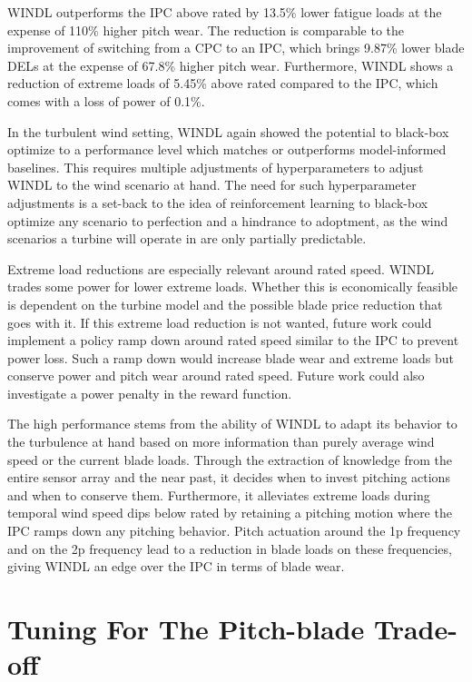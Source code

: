 WINDL outperforms the IPC above rated by 13.5\% lower fatigue loads at the expense of 110\% higher pitch wear. The reduction is comparable to the improvement of switching from a CPC to an IPC, which brings 9.87\% lower blade DELs at the expense of 67.8\% higher pitch wear. Furthermore, WINDL shows a reduction of extreme loads of 5.45\% above rated compared to the IPC, which comes with a loss of power of 0.1\%.

In the turbulent wind setting, WINDL again showed the potential to black-box optimize to a performance level which matches or outperforms model-informed baselines. This requires multiple adjustments of hyperparameters to adjust WINDL to the wind scenario at hand. The need for such hyperparameter adjustments is a set-back to the idea of reinforcement learning to black-box optimize any scenario to perfection and a hindrance to adoptment, as the wind scenarios a turbine will operate in are only partially predictable.

Extreme load reductions are especially relevant around rated speed. WINDL trades some power for lower extreme loads. Whether this is economically feasible is dependent on the turbine model and the possible blade price reduction that goes with it. If this extreme load reduction is not wanted, future work could implement a policy ramp down around rated speed similar to the IPC to prevent power loss. Such a ramp down would increase blade wear and extreme loads but conserve power and pitch wear around rated speed. Future work could also investigate a power penalty in the reward function.

The high performance stems from the ability of WINDL to adapt its behavior to the turbulence at hand based on more information than purely average wind speed or the current blade loads. Through the extraction of knowledge from the entire sensor array and the near past, it decides when to invest pitching actions and when to conserve them. Furthermore, it alleviates extreme loads during temporal wind speed dips below rated by retaining a pitching motion where the IPC ramps down any pitching behavior. Pitch actuation around the 1p frequency and on the 2p frequency lead to a reduction in blade loads on these frequencies, giving WINDL an edge over the IPC in terms of blade wear.


\section{Tuning For The Pitch-blade Trade-off}
\label{section:results-pb-trade-off}

